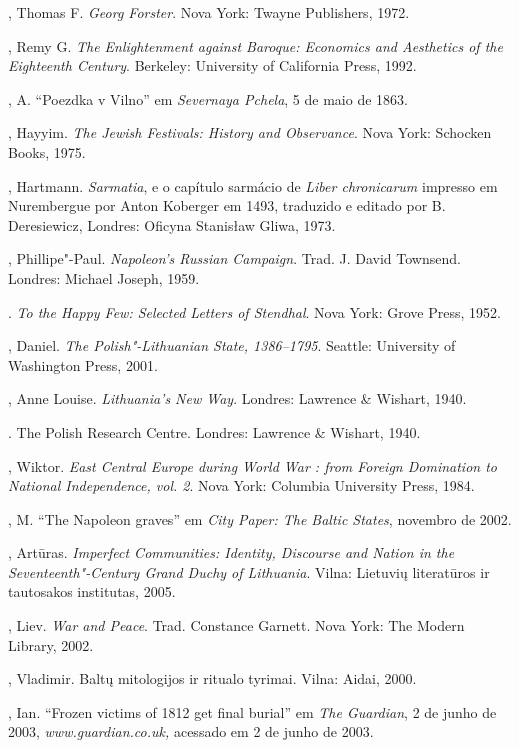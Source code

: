 \begin{bibliohedra}
  , Thomas F. \textit{Georg Forster}. Nova York: Twayne Publishers,
  1972.

  , Remy G. \textit{The Enlightenment against Baroque: Economics
  and Aesthetics of the Eighteenth Century}. Berkeley: University of
  California Press, 1992.

  , A. ``Poezdka v Vilno'' em \textit{Severnaya Pchela}, 5 de maio de
  1863.

  , Hayyim. \textit{The Jewish Festivals: History and Observance}.
  Nova York: Schocken Books, 1975.

  , Hartmann. \textit{Sarmatia}, e o capítulo sarmácio de
  \textit{Liber chronicarum} impresso em Nurembergue por Anton Koberger em
  1493, traduzido e editado por B. Deresiewicz, Londres: Oficyna
  Stanisław Gliwa, 1973.

  , Phillipe"-Paul. \textit{Napoleon's Russian Campaign}. Trad. J.
  David Townsend. Londres: Michael Joseph, 1959.

  . \textit{To the Happy Few: Selected Letters of Stendhal}. Nova
  York: Grove Press, 1952.

  , Daniel. \textit{The Polish"-Lithuanian State, 1386--1795}. Seattle:
  University of Washington Press, 2001.

  , Anne Louise. \textit{Lithuania's New Way}. Londres: Lawrence \&
  Wishart, 1940.

  . The Polish Research Centre. Londres:
  Lawrence \& Wishart, 1940.

  , Wiktor. \textit{East Central Europe during World War :
  from Foreign Domination to National Independence, vol. 2}. Nova York:
  Columbia University Press, 1984.

  , M. ``The Napoleon graves'' em \textit{City Paper: The Baltic
  States}, novembro de 2002.

  , Artūras. \textit{Imperfect Communities: Identity, Discourse
  and Nation in the Seventeenth"-Century Grand Duchy of Lithuania}.
  Vilna: Lietuvių literatūros ir tautosakos institutas, 2005.

  , Liev. \textit{War and Peace}. Trad. Constance Garnett. Nova York:
  The Modern Library, 2002.

  , Vladimir. Baltų mitologijos ir ritualo tyrimai. Vilna:
  Aidai, 2000.

  , Ian. ``Frozen victims of 1812 get final burial'' em \textit{The
  Guardian}, 2 de junho de 2003, \textit{www.guardian.co.uk,} acessado em
  2 de junho de 2003.


\end{bibliohedra}
